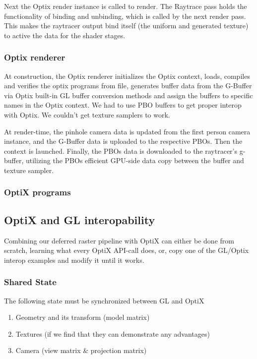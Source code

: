 Next the Optix render instance is called to render.
The Raytrace pass holds the functionality of binding and unbinding, which is called by the next render pass. This makes the raytracer output bind itself (the uniform and generated texture) to active the data for the shader stages.

\subsubsection{Optix renderer}
At construction, the Optix renderer initializes the Optix context, loads, compiles and verifies the optix programs from file, generates buffer data from the G-Buffer via Optix built-in GL buffer conversion methods and assign the buffers to specific names in the Optix context. We had to use PBO buffers to get proper interop with Optix. We couldn't get texture samplers to work.

At render-time, the pinhole camera data is updated from the first person camera instance, and the G-Buffer data is uploaded to the respective PBOs. Then the context is launched. Finally, the PBOs data is downloaded to the raytracer's g-buffer, utilizing the PBOs efficient GPU-side data copy between the buffer and texture sampler.

\subsubsection{OptiX programs}

\subsection{OptiX and GL interopability}
Combining our deferred raster pipeline with OptiX can either be done from scratch, learning what every OptiX API-call does, or, copy one of the GL/Optix interop examples and modify it until it works.

\subsubsection{Shared State}
The following state must be synchronized between GL and OptiX

\begin{enumerate}
	\item Geometry and its transform (model matrix)
	\item Textures (if we find that they can demonstrate any advantages)
	\item Camera (view matrix \& projection matrix)
\end{enumerate}

